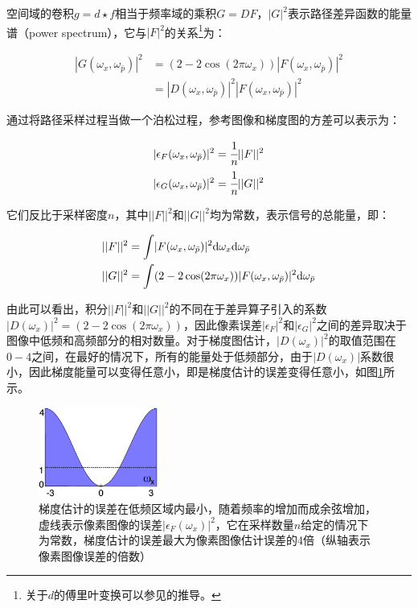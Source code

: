 空间域的卷积$g=d\star f$相当于频率域的乘积$G=DF$，$|G|^2$表示路径差异函数的能量谱（power spectrum），它与$|F|^2$的关系\footnote{关于$d$的傅里叶变换可以参见\cite{a:SupplementalMaterialforGradientDomainPathTracing}的推导。}为：

\begin{equation}
\begin{aligned}
	|G(\omega_x,\omega_{\bar{p}})|^{2}&=(2-2\cos(2\pi\omega_x))|F(\omega_x,\omega_{\bar{p}})|^{2}\\
	&=|D(\omega_x,\omega_{\bar{p}})|^{2}|F(\omega_x,\omega_{\bar{p}})|^{2}
\end{aligned}
\end{equation}

\cite{a:GradientDomainPathTracing}通过将路径采样过程当做一个泊松过程，参考图像和梯度图的方差可以表示为：

\begin{equation}
	\begin{aligned}
		|\epsilon_F (\omega_x,\omega_{\bar{p}}) |^2 &= \cfrac{1}{n}||F||^2 \\
		|\epsilon_G (\omega_x,\omega_{\bar{p}}) |^2 &= \cfrac{1}{n}||G||^2
	\end{aligned}
\end{equation}

\noindent 它们反比于采样密度$n$，其中$||F||^2$和$||G||^2$均为常数，表示信号的总能量，即：

\begin{equation}
\begin{aligned}
	||F||^2 &={\rm \int} |F(\omega_x,\omega_{\bar{p}})|^{2}{\rm d}\omega_x {\rm d}\omega_{\bar{p}}\\
	||G||^2 &={\rm \int} (2-2\cos(2\pi\omega_x))|F(\omega_x,\omega_{\bar{p}})|^{2} {\rm d}\omega_{\bar{p}}	
\end{aligned}
\end{equation}

\noindent 由此可以看出，积分$||F||^2$和$||G||^2$的不同在于差异算子引入的系数$|D(\omega_x)|^2=(2-2\cos (2\pi\omega_x))$，因此像素误差$|\epsilon_F |^2$和$|\epsilon_G |^2$之间的差异取决于图像中低频和高频部分的相对数量。对于梯度图估计，$|D(\omega_x)|^2$的取值范围在$0-4$之间，在最好的情况下，所有的能量处于低频部分，由于$|D(\omega_x)|$系数很小，因此梯度能量可以变得任意小，即是梯度估计的误差变得任意小，如图\ref{f:pt-gradient-error}所示。

\begin{figure}
	\sidecaption
	\includegraphics[width=0.35\textwidth]{figures/pt/gradient-error}
	\caption{梯度估计的误差在低频区域内最小，随着频率的增加而成余弦增加，虚线表示像素图像的误差$|\epsilon_F(\omega_x)|^2$，它在采样数量$n$给定的情况下为常数，梯度估计的误差最大为像素图像估计误差的4倍（纵轴表示像素图像误差的倍数）}
	\label{f:pt-gradient-error}
\end{figure}

